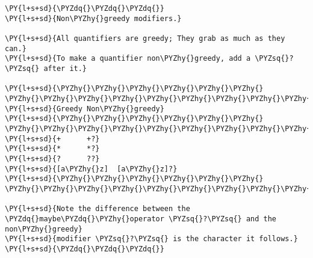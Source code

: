 

\section*{}

\begin{Verbatim}[commandchars=\\\{\}]
\PY{l+s+sd}{\PYZdq{}\PYZdq{}\PYZdq{}}
\PY{l+s+sd}{Non\PYZhy{}greedy modifiers.}

\PY{l+s+sd}{All quantifiers are greedy; They grab as much as they can.}
\PY{l+s+sd}{To make a quantifier non\PYZhy{}greedy, add a \PYZsq{}?\PYZsq{} after it.}

\PY{l+s+sd}{\PYZhy{}\PYZhy{}\PYZhy{}\PYZhy{}\PYZhy{}\PYZhy{} \PYZhy{}\PYZhy{}\PYZhy{}\PYZhy{}\PYZhy{}\PYZhy{}\PYZhy{}\PYZhy{}\PYZhy{}\PYZhy{}}
\PY{l+s+sd}{Greedy Non\PYZhy{}greedy}
\PY{l+s+sd}{\PYZhy{}\PYZhy{}\PYZhy{}\PYZhy{}\PYZhy{}\PYZhy{} \PYZhy{}\PYZhy{}\PYZhy{}\PYZhy{}\PYZhy{}\PYZhy{}\PYZhy{}\PYZhy{}\PYZhy{}\PYZhy{}}
\PY{l+s+sd}{+      +?}
\PY{l+s+sd}{*      *?}
\PY{l+s+sd}{?      ??}
\PY{l+s+sd}{[a\PYZhy{}z]  [a\PYZhy{}z]?}
\PY{l+s+sd}{\PYZhy{}\PYZhy{}\PYZhy{}\PYZhy{}\PYZhy{}\PYZhy{} \PYZhy{}\PYZhy{}\PYZhy{}\PYZhy{}\PYZhy{}\PYZhy{}\PYZhy{}\PYZhy{}\PYZhy{}\PYZhy{}}

\PY{l+s+sd}{Note the difference between the \PYZdq{}maybe\PYZdq{}\PYZhy{}operator \PYZsq{}?\PYZsq{} and the non\PYZhy{}greedy}
\PY{l+s+sd}{modifier \PYZsq{}?\PYZsq{} is the character it follows.}
\PY{l+s+sd}{\PYZdq{}\PYZdq{}\PYZdq{}}
\end{Verbatim}
